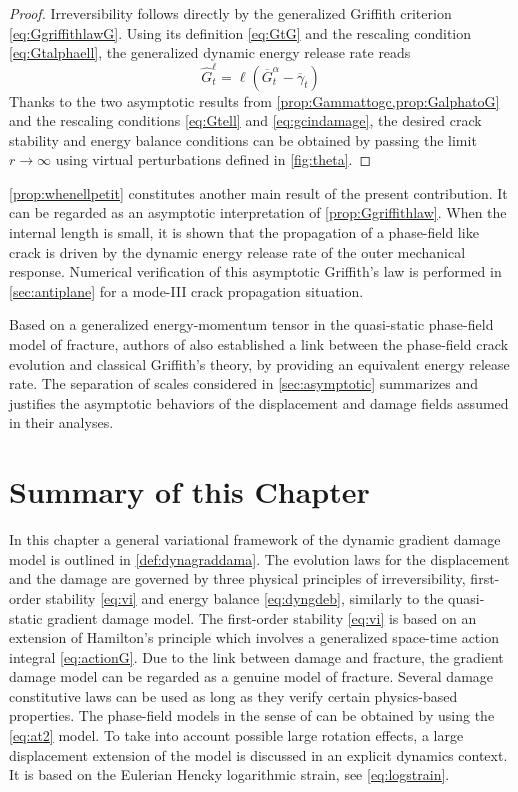 \begin{proof}
Irreversibility follows directly by the generalized Griffith criterion \eqref{eq:GgriffithlawG}. Using its definition \eqref{eq:GtG} and the rescaling condition \eqref{eq:Gtalphaell}, the generalized dynamic energy release rate reads
\[
\widehat{G}^\ell_t=\ell(\overline{G}_t^\alpha-\overline{\gamma}_t)
\]
Thanks to the two asymptotic results from \cref{prop:Gammattogc,prop:GalphatoG} and the rescaling conditions \eqref{eq:Gtell} and \eqref{eq:gcindamage}, the desired crack stability and energy balance conditions can be obtained by passing the limit $r\to\infty$ using virtual perturbations defined in \cref{fig:theta}.
\end{proof}

\begin{remark}
\cref{prop:whenellpetit} constitutes another main result of the present contribution. It can be regarded as an asymptotic interpretation of \cref{prop:Ggriffithlaw}. When the internal length is small, it is shown that the propagation of a phase-field like crack is driven by the dynamic energy release rate of the outer mechanical response. Numerical verification of this asymptotic Griffith's law is performed in \cref{sec:antiplane} for a mode-III crack propagation situation.
\end{remark}

\begin{remark}
Based on a generalized energy-momentum tensor in the quasi-static phase-field model of fracture, authors of \cite{Ballarini:2016aa,HakimKarma:2009} also established a link between the phase-field crack evolution and classical Griffith's theory, by providing an equivalent energy release rate. The separation of scales considered in \cref{sec:asymptotic} summarizes and justifies the asymptotic behaviors of the displacement and damage fields assumed in their analyses.
\end{remark}

\section*{Summary of this Chapter}
In this chapter a general variational framework of the dynamic gradient damage model is outlined in \cref{def:dynagraddama}. The evolution laws for the displacement and the damage are governed by three physical principles of irreversibility, first-order stability \eqref{eq:vi} and energy balance \eqref{eq:dyngdeb}, similarly to the quasi-static gradient damage model. The first-order stability \eqref{eq:vi} is based on an extension of Hamilton's principle which involves a generalized space-time action integral \eqref{eq:actionG}. Due to the link between damage and fracture, the gradient damage model can be regarded as a genuine model of fracture. Several damage constitutive laws can be used as long as they verify certain physics-based properties. The phase-field models in the sense of \cite{MieheHofackerWelschinger:2010,MieheWelschingerHofacker:2010} can be obtained by using the \eqref{eq:at2} model. To take into account possible large rotation effects, a large displacement extension of the model is discussed in an explicit dynamics context. It is based on the Eulerian Hencky logarithmic strain, see \eqref{eq:logstrain}.

